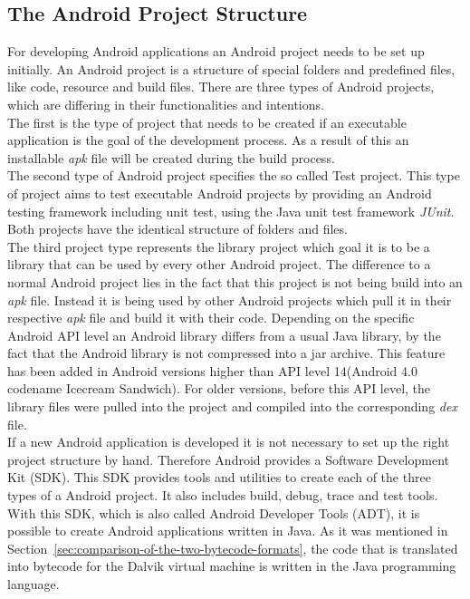 \subsection{The Android Project Structure}
\label{sec:migration:the-android-project-structure}
For developing Android applications an Android project needs to be set up initially.
An Android project is a structure of special folders and predefined files, like code, resource and build files.
There are three types of Android projects, which are differing in their functionalities and intentions.\\
The first is the type of project that needs to be created if an executable application is the goal of the development process.
As a result of this an installable \textit{apk} file will be created during the build process.\\
The second type of Android project specifies the so called Test project.
This type of project aims to test executable Android projects by providing an Android testing framework including unit test, using the Java unit test framework \textit{JUnit}.
Both projects have the identical structure of folders and files.\\
The third project type represents the library project which goal it is to be a library that can be used by every other Android project.
The difference to a normal Android project lies in the fact that this project is not being build into an \textit{apk} file.
Instead it is being used by other Android projects which pull it in their respective \textit{apk} file and build it with their code.
Depending on the specific Android API level an Android library differs from a usual Java library, by the fact that the Android library is not compressed into a jar archive.
This feature has been added in Android versions higher than API level 14(Android 4.0 codename Icecream Sandwich).
For older versions, before this API level, the library files were pulled into the project and compiled into the corresponding \textit{dex} file.\\
If a new Android application is developed it is not necessary to set up the right project structure by hand.
Therefore Android provides a Software Development Kit (SDK).
This SDK provides tools and utilities to create each of the three types of a Android project.
It also includes build, debug, trace and test tools.
With this SDK, which is also called Android Developer Tools (ADT), it is possible to create Android applications written in Java.
As it was mentioned in Section~\ref{sec:comparison-of-the-two-bytecode-formats}, the code that is translated into bytecode for the Dalvik virtual machine is written in the Java programming language.
